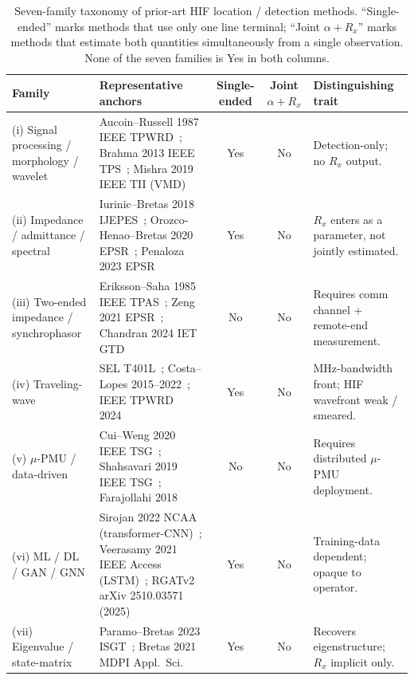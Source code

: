 \documentclass[journal]{IEEEtran}
\begin{document}
\begin{table}[t]
\caption{Seven-family taxonomy of prior-art HIF location / detection
methods.  ``Single-ended'' marks methods that use only one line
terminal; ``Joint $\alpha\!+\!R_x$'' marks methods that estimate both
quantities simultaneously from a single observation.  None of the
seven families is Yes in both columns.}
\label{tab:taxonomy}
\centering
\renewcommand{\arraystretch}{1.18}
\begin{tabular}{@{}p{2.6cm}p{6.6cm}cc p{3.4cm}@{}}
\toprule
\textbf{Family} & \textbf{Representative anchors} &
\textbf{Single-ended} & \textbf{Joint $\alpha\!+\!R_x$} &
\textbf{Distinguishing trait}\\
\midrule
(i) Signal processing / morphology / wavelet
  & Aucoin--Russell 1987 IEEE TPWRD~\cite{AucoinRussell1987TPWRD};
    Brahma 2013 IEEE TPS~\cite{Brahma2013TPS};
    Mishra 2019 IEEE TII (VMD)~\cite{Mishra2019TII}
  & Yes & No
  & Detection-only; no $R_x$ output.\\
(ii) Impedance / admittance / spectral
  & Iurinic--Bretas 2018 IJEPES~\cite{IurinicBretas2018IJEPES};
    Orozco-Henao--Bretas 2020 EPSR~\cite{OrozcoHenaoBretas2020EPSR};
    Penaloza 2023 EPSR~\cite{Penaloza2023EPSR}
  & Yes & No
  & $R_x$ enters as a parameter, not jointly estimated.\\
(iii) Two-ended impedance / synchrophasor
  & Eriksson--Saha 1985 IEEE TPAS~\cite{ErikssonSaha1985TPAS};
    Zeng 2021 EPSR~\cite{Zeng2021EPSR};
    Chandran 2024 IET GTD~\cite{Chandran2024IETGTD}
  & No & No
  & Requires comm channel + remote-end measurement.\\
(iv) Traveling-wave
  & SEL T401L~\cite{SEL_T401L_TM};
    Costa--Lopes 2015--2022~\cite{CostaLopes2015};
    IEEE TPWRD 2024~\cite{IEEE_TPWRD_TW_2024}
  & Yes & No
  & MHz-bandwidth front; HIF wavefront weak / smeared.\\
(v) $\mu$-PMU / data-driven
  & Cui--Weng 2020 IEEE TSG~\cite{CuiWeng2020TSG};
    Shahsavari 2019 IEEE TSG~\cite{Shahsavari2019TSG};
    Farajollahi 2018~\cite{Farajollahi2018}
  & No & No
  & Requires distributed $\mu$-PMU deployment.\\
(vi) ML / DL / GAN / GNN
  & Sirojan 2022 NCAA (transformer-CNN)~\cite{Sirojan2022NCAA};
    Veerasamy 2021 IEEE Access (LSTM)~\cite{Veerasamy2021Access};
    RGATv2 arXiv 2510.03571 (2025)~\cite{RGATv2_2025_arXiv}
  & Yes & No
  & Training-data dependent; opaque to operator.\\
(vii) Eigenvalue / state-matrix
  & Paramo--Bretas 2023 ISGT~\cite{ParamoBretas2023ISGT};
    Bretas 2021 MDPI Appl.\ Sci.~\cite{Bretas2021MDPI}
  & Yes & No
  & Recovers eigenstructure; $R_x$ implicit only.\\
\bottomrule
\end{tabular}
\end{table}
\end{document}
